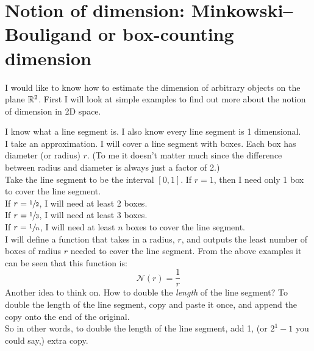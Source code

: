 \documentclass[11pt]{ekblite}
\begin{document}
\section{Notion of dimension: Minkowski–Bouligand or box-counting dimension}
I would like to know how to estimate the dimension of arbitrary objects on the plane $\mathbb{R}^2$. First I will look at simple examples to find out more about the notion of dimension in 2D space.
\begin{example}
	I know what a line segment is. I also know every line segment is 1 dimensional.
	\\[0.2in]I take an approximation. I will cover a line segment with boxes. Each box has diameter (or radius) $r$. (To me it doesn't matter much since the difference between radius and diameter is always just a factor of 2.)
	\\[0.2in]Take the line segment to be the interval $[0,1]$. If $r = 1$, then I need only 1 box to cover the line segment.
	\\[0.2in]If $r = \sfrac{1}{2}$, I will need at least 2 boxes.
	\\[0.2in]If $r = \sfrac{1}{3}$, I will need at least 3 boxes.
	\\[0.2in]If $r = \sfrac{1}{n}$, I will need at least $n$ boxes to cover the line segment.
	\\[0.2in]I will define a function that takes in a radius, $r$, and outputs the least number of boxes of radius $r$ needed to cover the line segment. From the above examples it can be seen that this function is:
	\[\mathcal{N}(r) = \frac{1}{r} \]
	Another idea to think on. How to double the \textit{length} of the line segment? To double the length of the line segment, copy and paste it once, and append the copy onto the end of the original. 
	\\[0.2in]So in other words, to double the length of the line segment, add 1, (or $2^1 - 1$ you could say,) extra copy.
\end{example}
\end{document}

